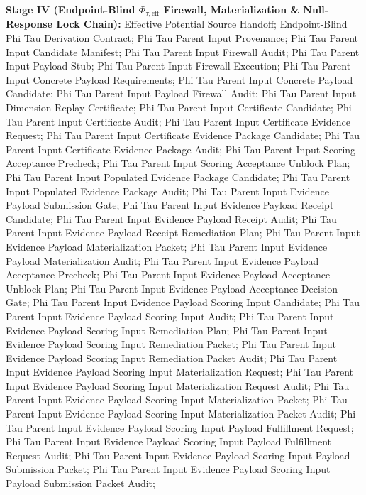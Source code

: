 \documentclass[11pt]{article}
\begin{document}
\smallskip\noindent\textbf{Stage IV (Endpoint-Blind $\Phi_{\tau,\mathrm{eff}}$ Firewall, Materialization \& Null-Response Lock Chain):}
Effective Potential Source Handoff;
Endpoint-Blind Phi Tau Derivation Contract;
Phi Tau Parent Input Provenance;
Phi Tau Parent Input Candidate Manifest;
Phi Tau Parent Input Firewall Audit;
Phi Tau Parent Input Payload Stub;
Phi Tau Parent Input Firewall Execution;
Phi Tau Parent Input Concrete Payload Requirements;
Phi Tau Parent Input Concrete Payload Candidate;
Phi Tau Parent Input Payload Firewall Audit;
Phi Tau Parent Input Dimension Replay Certificate;
Phi Tau Parent Input Certificate Candidate;
Phi Tau Parent Input Certificate Audit;
Phi Tau Parent Input Certificate Evidence Request;
Phi Tau Parent Input Certificate Evidence Package Candidate;
Phi Tau Parent Input Certificate Evidence Package Audit;
Phi Tau Parent Input Scoring Acceptance Precheck;
Phi Tau Parent Input Scoring Acceptance Unblock Plan;
Phi Tau Parent Input Populated Evidence Package Candidate;
Phi Tau Parent Input Populated Evidence Package Audit;
Phi Tau Parent Input Evidence Payload Submission Gate;
Phi Tau Parent Input Evidence Payload Receipt Candidate;
Phi Tau Parent Input Evidence Payload Receipt Audit;
Phi Tau Parent Input Evidence Payload Receipt Remediation Plan;
Phi Tau Parent Input Evidence Payload Materialization Packet;
Phi Tau Parent Input Evidence Payload Materialization Audit;
Phi Tau Parent Input Evidence Payload Acceptance Precheck;
Phi Tau Parent Input Evidence Payload Acceptance Unblock Plan;
Phi Tau Parent Input Evidence Payload Acceptance Decision Gate;
Phi Tau Parent Input Evidence Payload Scoring Input Candidate;
Phi Tau Parent Input Evidence Payload Scoring Input Audit;
Phi Tau Parent Input Evidence Payload Scoring Input Remediation Plan;
Phi Tau Parent Input Evidence Payload Scoring Input Remediation Packet;
Phi Tau Parent Input Evidence Payload Scoring Input Remediation Packet Audit;
Phi Tau Parent Input Evidence Payload Scoring Input Materialization Request;
Phi Tau Parent Input Evidence Payload Scoring Input Materialization Request Audit;
Phi Tau Parent Input Evidence Payload Scoring Input Materialization Packet;
Phi Tau Parent Input Evidence Payload Scoring Input Materialization Packet Audit;
Phi Tau Parent Input Evidence Payload Scoring Input Payload Fulfillment Request;
Phi Tau Parent Input Evidence Payload Scoring Input Payload Fulfillment Request Audit;
Phi Tau Parent Input Evidence Payload Scoring Input Payload Submission Packet;
Phi Tau Parent Input Evidence Payload Scoring Input Payload Submission Packet Audit;
\end{document}
